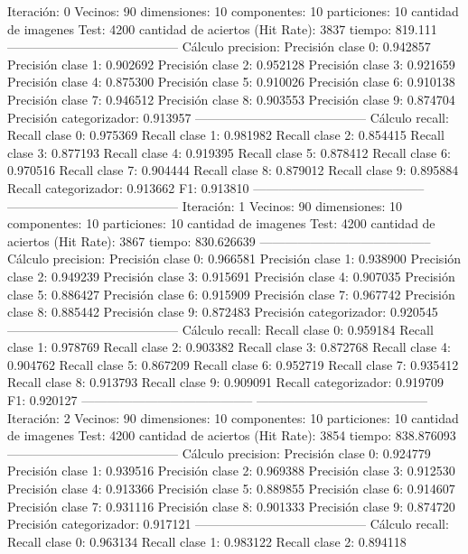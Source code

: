 Iteración: 0
Vecinos: 90
dimensiones: 10
componentes: 10
particiones: 10
cantidad de imagenes Test: 4200
cantidad de aciertos (Hit Rate): 3837
tiempo: 819.111
-----------------------------------------
Cálculo precision: 
Precisión clase 0: 0.942857
Precisión clase 1: 0.902692
Precisión clase 2: 0.952128
Precisión clase 3: 0.921659
Precisión clase 4: 0.875300
Precisión clase 5: 0.910026
Precisión clase 6: 0.910138
Precisión clase 7: 0.946512
Precisión clase 8: 0.903553
Precisión clase 9: 0.874704
Precisión categorizador: 0.913957
-----------------------------------------
Cálculo recall: 
Recall clase 0: 0.975369
Recall clase 1: 0.981982
Recall clase 2: 0.854415
Recall clase 3: 0.877193
Recall clase 4: 0.919395
Recall clase 5: 0.878412
Recall clase 6: 0.970516
Recall clase 7: 0.904444
Recall clase 8: 0.879012
Recall clase 9: 0.895884
Recall categorizador: 0.913662
F1: 0.913810
-----------------------------------------
-----------------------------------------
Iteración: 1
Vecinos: 90
dimensiones: 10
componentes: 10
particiones: 10
cantidad de imagenes Test: 4200
cantidad de aciertos (Hit Rate): 3867
tiempo: 830.626639
-----------------------------------------
Cálculo precision: 
Precisión clase 0: 0.966581
Precisión clase 1: 0.938900
Precisión clase 2: 0.949239
Precisión clase 3: 0.915691
Precisión clase 4: 0.907035
Precisión clase 5: 0.886427
Precisión clase 6: 0.915909
Precisión clase 7: 0.967742
Precisión clase 8: 0.885442
Precisión clase 9: 0.872483
Precisión categorizador: 0.920545
-----------------------------------------
Cálculo recall: 
Recall clase 0: 0.959184
Recall clase 1: 0.978769
Recall clase 2: 0.903382
Recall clase 3: 0.872768
Recall clase 4: 0.904762
Recall clase 5: 0.867209
Recall clase 6: 0.952719
Recall clase 7: 0.935412
Recall clase 8: 0.913793
Recall clase 9: 0.909091
Recall categorizador: 0.919709
F1: 0.920127
-----------------------------------------
-----------------------------------------
Iteración: 2
Vecinos: 90
dimensiones: 10
componentes: 10
particiones: 10
cantidad de imagenes Test: 4200
cantidad de aciertos (Hit Rate): 3854
tiempo: 838.876093
-----------------------------------------
Cálculo precision: 
Precisión clase 0: 0.924779
Precisión clase 1: 0.939516
Precisión clase 2: 0.969388
Precisión clase 3: 0.912530
Precisión clase 4: 0.913366
Precisión clase 5: 0.889855
Precisión clase 6: 0.914607
Precisión clase 7: 0.931116
Precisión clase 8: 0.901333
Precisión clase 9: 0.874720
Precisión categorizador: 0.917121
-----------------------------------------
Cálculo recall: 
Recall clase 0: 0.963134
Recall clase 1: 0.983122
Recall clase 2: 0.894118
